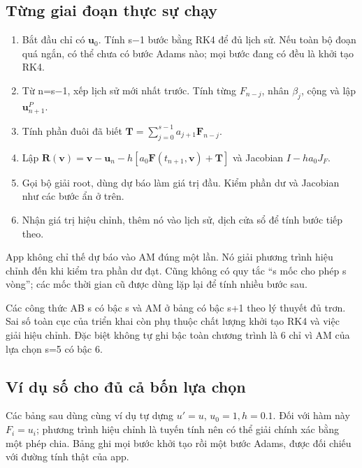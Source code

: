 \subsection{Từng giai đoạn thực sự chạy}
\begin{enumerate}
\item Bắt đầu chỉ có $\mathbf u_0$. Tính s−1 bước bằng RK4 để đủ lịch sử. Nếu toàn bộ đoạn quá ngắn, có thể chưa có bước Adams nào; mọi bước đang có đều là khởi tạo RK4.
\item Từ n=s−1, xếp lịch sử mới nhất trước. Tính từng $F_{n-j}$, nhân $\beta_j$, cộng và lập $\mathbf u_{n+1}^P$.
\item Tính phần đuôi đã biết $\mathbf T=\sum_{j=0}^{s-1}a_{j+1}\mathbf F_{n-j}$.
\item Lập $\mathbf R(\mathbf v)=\mathbf v-\mathbf u_n-h[a_0\mathbf F(t_{n+1},\mathbf v)+\mathbf T]$ và Jacobian $I-ha_0J_F$.
\item Gọi bộ giải root, dùng dự báo làm giá trị đầu. Kiểm phần dư và Jacobian như các bước ẩn ở trên.
\item Nhận giá trị hiệu chỉnh, thêm nó vào lịch sử, dịch cửa sổ để tính bước tiếp theo.
\end{enumerate}
App không chỉ thế dự báo vào AM đúng một lần. Nó giải phương trình hiệu chỉnh đến khi kiểm tra phần dư đạt. Cũng không có quy tắc ``s mốc cho phép s vòng''; các mốc thời gian cũ được dùng lặp lại để tính nhiều bước sau.

Các công thức AB s có bậc s và AM ở bảng có bậc s+1 theo lý thuyết đủ trơn. Sai số toàn cục của triển khai còn phụ thuộc chất lượng khởi tạo RK4 và việc giải hiệu chỉnh. Đặc biệt không tự ghi bậc toàn chương trình là 6 chỉ vì AM của lựa chọn s=5 có bậc 6.

\subsection{Ví dụ số cho đủ cả bốn lựa chọn}
Các bảng sau dùng cùng ví dụ tự dựng $u'=u$, $u_0=1,h=0.1$. Đối với hàm này $F_i=u_i$; phương trình hiệu chỉnh là tuyến tính nên có thể giải chính xác bằng một phép chia. Bảng ghi mọi bước khởi tạo rồi một bước Adams, được đối chiếu với đường tính thật của app.


